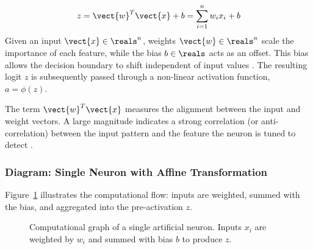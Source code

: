 \begin{equation}
z = \vect{w}^T \vect{x} + b = \sum_{i=1}^{n} w_i x_i + b
\end{equation}
\noindent Given an input $\vect{x} \in \reals^n$, weights $\vect{w} \in \reals^n$ scale the importance of each feature, while the bias $b \in \reals$ acts as an offset. This bias allows the decision boundary to shift independent of input values \cite{Goodfellow2016}. The resulting logit $z$ is subsequently passed through a non-linear activation function, $a = \phi(z)$.

The term $\vect{w}^T \vect{x}$ measures the alignment between the input and weight vectors. A large magnitude indicates a strong correlation (or anti-correlation) between the input pattern and the feature the neuron is tuned to detect \cite{Haykin1999}.

\subsubsection{Diagram: Single Neuron with Affine Transformation}
Figure~\ref{fig:single_neuron} illustrates the computational flow: inputs are weighted, summed with the bias, and aggregated into the pre-activation $z$.

\begin{figure}[h]
\centering
{}
\caption{Computational graph of a single artificial neuron. Inputs $x_i$ are weighted by $w_i$ and summed with bias $b$ to produce $z$.}
\label{fig:single_neuron}
\end{figure}
